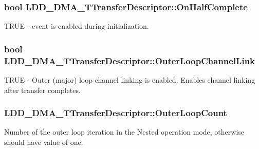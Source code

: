 \subsubsection[{On\+Half\+Complete}]{\setlength{\rightskip}{0pt plus 5cm}bool L\+D\+D\+\_\+\+D\+M\+A\+\_\+\+T\+Transfer\+Descriptor\+::\+On\+Half\+Complete}\label{struct_l_d_d___d_m_a___t_transfer_descriptor_a27b37f43ef69a8644ec04166660a7c24}
T\+R\+U\+E -\/ event is enabled during initialization. \hypertarget{struct_l_d_d___d_m_a___t_transfer_descriptor_a4aad12602586d10ce5e460ed3f20daf4}{}
\subsubsection[{Outer\+Loop\+Channel\+Link}]{\setlength{\rightskip}{0pt plus 5cm}bool L\+D\+D\+\_\+\+D\+M\+A\+\_\+\+T\+Transfer\+Descriptor\+::\+Outer\+Loop\+Channel\+Link}\label{struct_l_d_d___d_m_a___t_transfer_descriptor_a4aad12602586d10ce5e460ed3f20daf4}
T\+R\+U\+E -\/ Outer (major) loop channel linking is enabled. Enables channel linking after transfer completes. \hypertarget{struct_l_d_d___d_m_a___t_transfer_descriptor_a57be3744be0a4cce03a93980199922ee}{}
\subsubsection[{Outer\+Loop\+Count}]{ L\+D\+D\+\_\+\+D\+M\+A\+\_\+\+T\+Transfer\+Descriptor\+::\+Outer\+Loop\+Count}\label{struct_l_d_d___d_m_a___t_transfer_descriptor_a57be3744be0a4cce03a93980199922ee}
Number of the outer loop iteration in the Nested operation mode, otherwise should have value of one. \hypertarget{struct_l_d_d___d_m_a___t_transfer_descriptor_a14137cdb670d104436bfdad1bb88f078}{}
